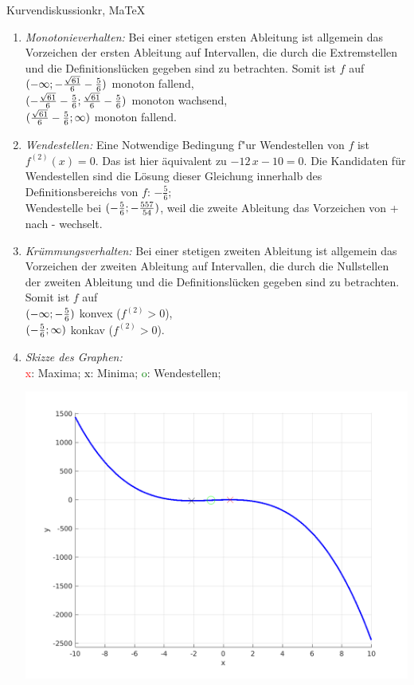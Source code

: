 \begin{MAufgabe}{Kurvendiskussion}{kr, MaTeX}
\begin{enumerate}
 \item \emph{Monotonieverhalten:} 
 Bei einer stetigen ersten Ableitung ist allgemein das Vorzeichen der ersten Ableitung auf Intervallen, die durch die Extremstellen und die Definitionsl\"ucken gegeben sind zu betrachten. Somit ist $f$ auf \\ 
 $(-\infty; - \frac{\sqrt{61}}{6} - \frac{5}{6})$ monoton fallend, \\ 
 $( - \frac{\sqrt{61}}{6} - \frac{5}{6};\frac{\sqrt{61}}{6} - \frac{5}{6})$ monoton  wachsend, \\ 
 $(\frac{\sqrt{61}}{6} - \frac{5}{6}; \infty)$ monoton fallend. \\ 
 \item \emph{Wendestellen:} 
 Eine Notwendige Bedingung f"ur Wendestellen von $f$ ist $f^{(2)}(x)=0$. 
 Das ist hier \"aquivalent zu $ - 12\, x - 10=0$. 
 Die Kandidaten f\"ur Wendestellen sind die L\"osung dieser Gleichung innerhalb des Definitionsbereichs von $f$: $- \frac{5}{6}$; \\ 
 Wendestelle bei $(- \frac{5}{6};- \frac{557}{54})$, weil die zweite Ableitung das Vorzeichen von + nach - wechselt. \\ 
 \item \emph{Kr\"ummungsverhalten:} 
 Bei einer stetigen zweiten Ableitung ist allgemein das Vorzeichen der zweiten Ableitung auf Intervallen, die durch die Nullstellen der zweiten Ableitung und die Definitionsl\"ucken gegeben sind zu betrachten. 
 Somit ist $f$ auf \\ 
 $(-\infty ;- \frac{5}{6})$  konvex ($f^{(2)}>0$), \\ 
 $(- \frac{5}{6}; \infty)$  konkav ($f^{(2)}>0$). \\ 
 \item \emph{Skizze des Graphen:} \\ 
 {\textcolor{red} x}: Maxima; {\textcolor{black} x}: Minima; {\textcolor{green} o}: Wendestellen; 
  \begin{center}
  \includegraphics[width=0.8\linewidth]{Abb_zur_Ag_autogenerated_fractions_49.png} \end{center}
  
 \end{enumerate}
 \else\relax\fi
  \end{MAufgabe}